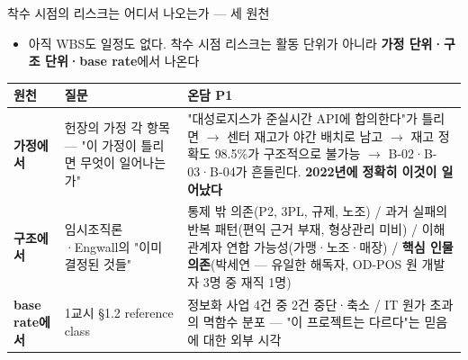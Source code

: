 \begin{frame}[allowframebreaks=1.0]{착수 시점의 리스크는 어디서 나오는가 — 세 원천}
\small
\begin{itemize}
\item\relax 아직 WBS도 일정도 없다. 착수 시점 리스크는 활동 단위가 아니라 \textbf{가정 단위·구조 단위·base rate}에서 나온다
\end{itemize}
{\footnotesize\setlength{\tabcolsep}{3pt}\renewcommand{\arraystretch}{1.12}
\begin{tabular}{@{}>{\raggedright\arraybackslash}p{}>{\raggedright\arraybackslash}p{}>{\raggedright\arraybackslash}p{}@{}}
\toprule
\textbf{원천} & \textbf{질문} & \textbf{온담 P1} \\
\midrule
\textbf{가정에서} & 헌장의 가정 각 항목 — "이 가정이 틀리면 무엇이 일어나는가" & "대성로지스가 준실시간 API에 합의한다"가 틀리면 $\rightarrow$ 센터 재고가 야간 배치로 남고 $\rightarrow$ 재고 정확도 98.5\%가 구조적으로 불가능 $\rightarrow$ B-02·B-03·B-04가 흔들린다. \textbf{2022년에 정확히 이것이 일어났다} \\
\textbf{구조에서} & 임시조직론·Engwall의 "이미 결정된 것들" & 통제 밖 의존(P2, 3PL, 규제, 노조) / 과거 실패의 반복 패턴(편익 근거 부재, 형상관리 미비) / 이해관계자 연합 가능성(가맹·노조·매장) / \textbf{핵심 인물 의존}(박세연 — 유일한 해독자, OD-POS 원 개발자 3명 중 재직 1명) \\
\textbf{base rate에서} & 1교시 §1.2 reference class & 정보화 사업 4건 중 2건 중단·축소 / IT 원가 초과의 멱함수 분포 — "이 프로젝트는 다르다"는 믿음에 대한 외부 시각 \\
\bottomrule
\end{tabular}}
\par\smallskip
{}
\end{frame}

